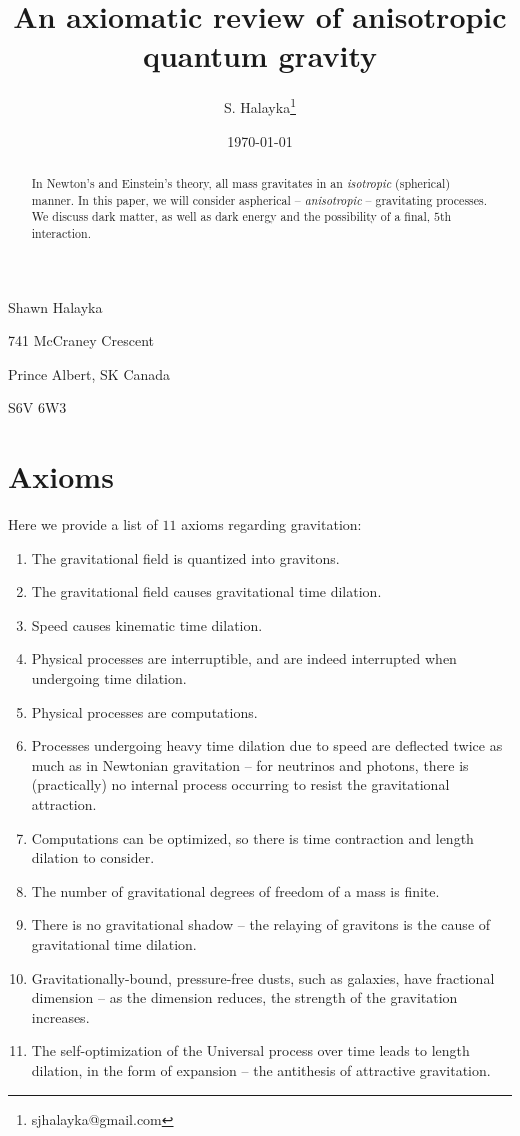 \documentclass[12pt]{article}
\title{An axiomatic review of anisotropic quantum gravity}
\author{S. Halayka\footnote{sjhalayka@gmail.com}}
\date{\today\;\currenttime}
\begin{document}
 
\maketitle



Shawn Halayka

741 McCraney Crescent

Prince Albert, SK Canada

S6V 6W3



\begin{abstract}
In Newton's and Einstein's theory, all mass gravitates in an {\textit{isotropic}} (spherical) manner.
In this paper, we will consider aspherical -- {\textit{anisotropic}} -- gravitating processes.
We discuss dark matter, as well as dark energy and the possibility of a final, $5$th interaction.
\end{abstract}





\section{Axioms}

Here we provide a list of $11$ axioms regarding gravitation:

\begin{enumerate}
\item The gravitational field is quantized into gravitons.
\item The gravitational field causes gravitational time dilation.
\item Speed causes kinematic time dilation.
\item Physical processes are interruptible, and are indeed interrupted when undergoing time dilation. 
\item Physical processes are computations.
\item Processes undergoing heavy time dilation due to speed are deflected twice as much as in Newtonian gravitation -- for neutrinos and photons, there is (practically) no internal process occurring to resist the gravitational attraction.
\item Computations can be optimized, so there is time contraction and length dilation to consider.
\item The number of gravitational degrees of freedom of a mass is finite.
\item There is no gravitational shadow -- the relaying of gravitons is the cause of gravitational time dilation.
\item Gravitationally-bound, pressure-free dusts, such as galaxies, have fractional dimension -- as the dimension reduces, the strength of the gravitation increases.
\item The self-optimization of the Universal process over time leads to length dilation, in the form of expansion -- the antithesis of attractive gravitation.
\end{enumerate}
\end{document}
